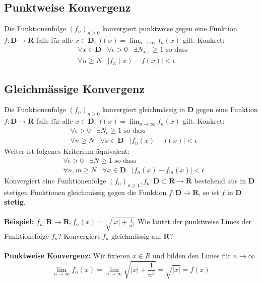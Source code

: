 \documentclass[8pt]{article}
\begin{document}
\begin{multicols*}{3}
 \subsection{Punktweise Konvergenz}
Die Funktionenfolge $(f_n)_{n \geq 0}$ konvergiert punktweise gegen eine Funktion
$f:\mathbf{D} \rightarrow \mathbf{R}$ falls für alle $x \in \mathbf{D}$, $f(x) = \lim_{n \rightarrow \infty} f_n(x)$ gilt. Konkret:
\begin{align*}
  &\forall x \in \mathbf{D} \;\;\; \forall \epsilon > 0 \;\;\; \exists N_{x, \epsilon} \geq 1 \text{ so dass }\\
  &\forall n \geq N \;\;\; |f_n(x) - f(x)| < \epsilon
\end{align*}
\subsection{Gleichmässige Konvergenz}
 Die Funktionenfolge $(f_n)_{n \geq 0}$ konvergiert gleichmässig in $\mathbf{D}$ gegen eine Funktion
$f:\mathbf{D} \rightarrow \mathbf{R}$ falls für alle $x \in \mathbf{D}$, $f(x) = \lim_{n \rightarrow \infty} f_n(x)$ gilt. Konkret:
\begin{align*}
  &\forall \epsilon > 0 \;\;\; \exists N_{\epsilon} \geq 1 \text{ so dass }\\
  &\forall n \geq N \;\;\;\forall x \in \mathbf{D} \;\;\; |f_n(x) - f(x)| < \epsilon
\end{align*}
Weiter ist folgenes Kriterium äquivalent:
\begin{align*}
  &\forall \epsilon > 0 \;\;\; \exists N \geq 1 \text{ so dass }\\
  &\forall n, m \geq N \;\;\;\forall x \in \mathbf{D} \;\;\; |f_n(x) - f_m(x)| < \epsilon
\end{align*}
Konvergiert eine Funktionenfolge $(f_n)_{n \geq 1}, f_n:\mathbf{D} \subset \mathbf{R} \rightarrow \mathbf{R}$
bestehend aus in $\mathbf{D}$ stetigen Funktionen gleichmässig gegen die Funktion $f:\mathbf{D} \rightarrow \mathbf{R}$, so
ist $f$ in $\mathbf{D}$ \textbf{stetig}.\\
\\
\textbf{Beispiel:}
$f_n : \mathbf{R} \rightarrow \mathbf{R}, f_n(x) = \sqrt{|x| + \frac{1}{n^3}}$
Wie lautet der punktweise Limes der Funktionsfolge $f_n$? Konvergiert $f_n$ gleichmässig auf  $\mathbf{R}$?\\ 
\\
\textbf{Punktweise Konvergenz:} Wir fixieren $x \in R$ und bilden den Limes für $n \rightarrow \infty$
$$
\lim_{n \to \infty} f_n(x) = \lim_{n \rightarrow \infty} \sqrt{|x| + \frac{1}{n^3}} = \sqrt{|x|} = f(x)
$$
\end{multicols*}
\end{document}
